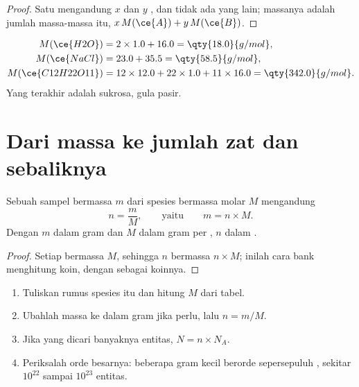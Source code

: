 \begin{proof}
Satu    mengandung $x$    dan $y$ 
 , dan tidak ada yang lain; massanya adalah jumlah massa-massa
itu, $x\,M(\ce{A}) + y\,M(\ce{B})$.
\end{proof}

\begin{example}\label{ex:g10:the-mole:three}
\begin{align*}
  M(\ce{H2O}) &= 2 \times 1.0 + 16.0 = \qty{18.0}{g/mol},\\
  M(\ce{NaCl}) &= 23.0 + 35.5 = \qty{58.5}{g/mol},\\
  M(\ce{C12H22O11}) &= 12 \times 12.0 + 22 \times 1.0 + 11 \times 16.0
     = \qty{342.0}{g/mol}.
\end{align*}
Yang terakhir adalah sukrosa, gula pasir.
\end{example}

\section{Dari massa ke jumlah zat dan sebaliknya}

\begin{proposition}\label{prop:g10:the-mole:mass}
Sebuah sampel bermassa $m$ dari spesies bermassa molar $M$ mengandung
\[
  n = \frac{m}{M}, \qquad\text{yaitu}\qquad m = n \times M .
\]
Dengan $m$ dalam gram dan $M$ dalam gram per , $n$ dalam .
\end{proposition}

\begin{proof}
Setiap  bermassa $M$, sehingga $n$  bermassa $n \times M$; inilah
cara bank menghitung koin, dengan  sebagai koinnya.
\end{proof}

\begin{method}\label{met:g10:the-mole:mass-to-number}
\begin{enumerate}
  \item Tuliskan rumus spesies itu dan hitung  $M$ dari
        tabel.
  \item Ubahlah massa ke dalam gram jika perlu, lalu $n = m / M$.
  \item Jika yang dicari banyaknya entitas, $N = n \times N_A$.
  \item Periksalah orde besarnya: beberapa gram  kecil berorde
        sepersepuluh , sekitar $10^{22}$ sampai $10^{23}$ entitas.
\end{enumerate}
\end{method}

